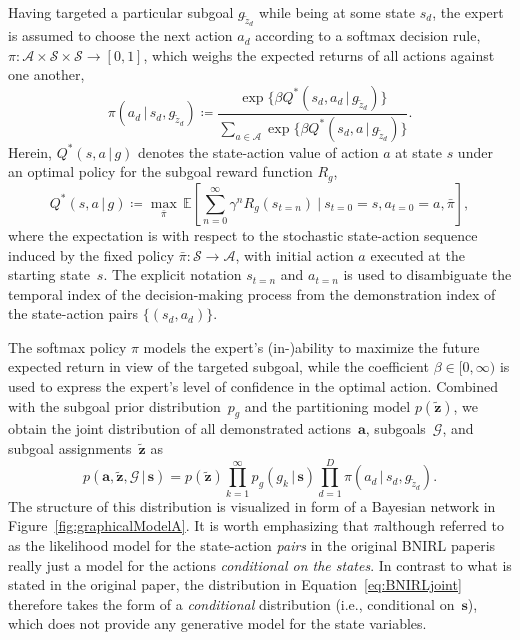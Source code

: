 \documentclass[twoside,11pt]{article}
\newcommand{\p}{p}
\newcommand{\given}{\,\vert\,}
\newcommand{\E}{\mathbb{E}}
\newcommand{\softmax}{{\pi}}
\newcommand{\defeq}{\coloneqq}
\newcommand{\eqkomma}{,}
\newcommand{\eqpunkt}{.}
\newcommand{\ie}{i.e.}
\newcommand{\einschub}[1]{\Emdash*#1\Emdash*}
\begin{document}
Having targeted a particular subgoal $g_{\tilde{z}_d}$ while being at some state $s_d$, the expert is assumed to choose the next action $a_d$ according to a softmax decision rule, $\softmax:\mathcal{A}\times\mathcal{S}\times\mathcal{S}\rightarrow[0,1]$, which weighs the expected returns of all actions against one another,
\begin{equation}
	\softmax(a_d \given s_d, g_{\tilde{z}_d}) \defeq \frac{\exp\big\{\beta Q^*(s_d, a_d \given g_{\tilde{z}_d})\big\}}{\sum_{a\in\mathcal{A}}\exp\big\{\beta Q^*(s_d, a \given g_{\tilde{z}_d})\big\}} \eqpunkt
	\label{eq:softmaxPolicy}
\end{equation}
Herein, $Q^*(s,a \given g)$ denotes the state-action value \citep[or \textit{Q-value},][]{sutton1998reinforcement} of action $a$ at state $s$ under an optimal policy for the subgoal reward function $R_g$,
\begin{equation}
	Q^*(s,a \given g) \defeq \max_{\bar{\pi}}\, \E \left[ \sum_{n=0}^\infty \gamma^{n}R_g(s_{t=n}) \ \Big|\  s_{t=0}=s, a_{t=0}=a, \bar{\pi} \right] \eqkomma
	\label{eq:Qfunction}
\end{equation}
where the expectation is with respect to the stochastic state-action sequence %
induced by the fixed policy $\bar{\pi}:\mathcal{S}\rightarrow\mathcal{A}$,  with initial action $a$ executed at the starting state~$s$. 
The explicit notation $s_{t=n}$ and $a_{t=n}$ %
is used to disambiguate the temporal index of the %
decision-making process from the demonstration index of the state-action pairs $\{(s_d,a_d)\}$.
%

The softmax policy $\softmax$ models the expert's %
(in-)ability to maximize the future expected return in view of the targeted subgoal, %
while the %
coefficient $\beta\in[0,\infty)$ is used to express %
the expert's level of confidence in the optimal action.
%
%
%
%
Combined with the subgoal prior distribution~$p_g$ %
and the partitioning model $p(\mathbf{\tilde{z}})$, we obtain the joint distribution of all demonstrated actions~$\mathbf{a}$, subgoals~$\mathcal{G}$, and subgoal assignments~$\mathbf{\tilde{z}}$ as
\begin{equation}
\p(\mathbf{a},\mathbf{\tilde{z}},\mathcal{G}\given \mathbf{s}) = \p(\mathbf{\tilde{z}}) \prod_{k=1}^{\infty} \p_g(g_k \given \mathbf{s}) \prod_{d=1}^D \softmax(a_d \given s_d, g_{\tilde{z}_d}) \eqpunkt %
\label{eq:BNIRLjoint}
\end{equation}
The structure of this distribution is visualized in form of a Bayesian network in Figure~\ref{fig:graphicalModelA}. It is worth emphasizing that $\pi$\einschub{although referred to as the likelihood model for the state-action \textit{pairs} in the original BNIRL paper}is really just a model for the actions \textit{conditional on the states}. %
%
In contrast to what is stated in the original paper, the distribution in Equation~\eqref{eq:BNIRLjoint} therefore takes the form of a \textit{conditional} distribution (\ie, conditional on~$\mathbf{s}$), which does not provide any generative model for the state variables.
\end{document}

